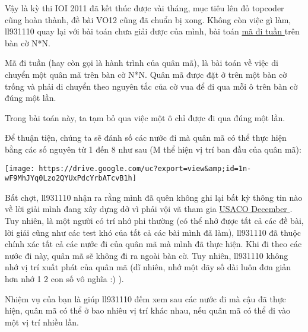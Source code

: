 Vậy là kỳ thi IOI 2011 đã kết thúc được vài tháng, mục tiêu lên đỏ topcoder cũng hoàn thành, đề bài VO12 cũng đã chuẩn bị xong. Không còn việc gì làm, ll931110 quay lại với bài toán chưa giải được của mình, bài toán \href{http://en.wikipedia.org/wiki/Knights_tour}{ mã đi tuần } trên bàn cờ N*N.

Mã đi tuần (hay còn gọi là hành trình của quân mã), là bài toán về việc di chuyển một quân mã trên bàn cờ N*N. Quân mã được đặt ở trên một bàn cờ trống và phải di chuyển theo nguyên tắc của cờ vua để đi qua mỗi ô trên bàn cờ đúng một lần.

Trong bài toán này, ta tạm bỏ qua việc một ô chỉ được đi qua đúng một lần.

Để thuận tiện, chúng ta sẽ đánh số các nước đi mà quân mã có thể thực hiện bằng các số nguyên từ 1 đến 8 như sau (M thể hiện vị trí ban đầu của quân mã):


\texttt{[image: https://drive.google.com/uc?export=view\&amp;id=1n-wF9MhJYq0Lzo2QYUxPdcYrbATcvB1h]}

Bất chợt, ll931110 nhận ra rằng mình đã quên không ghi lại bất kỳ thông tin nào về lời giải mình đang xây dựng dở vì phải vội vã tham gia \href{http://www.usaco.org/current/data/dec11_gold_results.html}{ USACO December } . Tuy nhiên, là một người có trí nhớ phi thường (có thể nhớ được tất cả các đề bài, lời giải cũng như các test khó của tất cả các bài mình đã làm), ll931110 đã thuộc chính xác tất cả các nước đi của quân mã mà mình đã thực hiện. Khi đi theo các nước đi này, quân mã sẽ không đi ra ngoài bàn cờ. Tuy nhiên, ll931110 không nhớ vị trí xuất phát của quân mã (dĩ nhiên, nhớ một dãy số dài luôn đơn giản hơn nhớ 1 2 con số vô nghĩa :) ).

Nhiệm vụ của bạn là giúp ll931110 đếm xem sau các nước đi mà cậu đã thực hiện, quân mã có thể ở bao nhiêu vị trí khác nhau, nếu quân mã có thể đi vào một vị trí nhiều lần.
